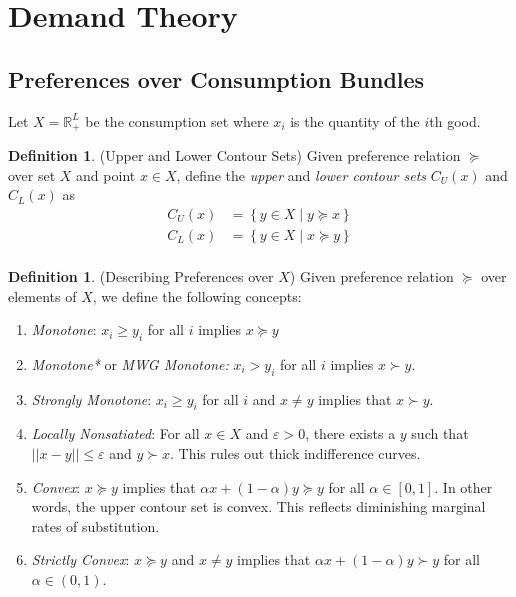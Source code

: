 \documentclass[12pt]{article}
\theoremstyle{plain}
\theoremstyle{definition}
\newtheorem{defn}[thm]{Definition}
\theoremstyle{remark}
\newcommand{\R}{\mathbb{R}}
\begin{document}
\clearpage
\section{Demand Theory}

\subsection{Preferences over Consumption Bundles}

Let $X=\R^L_+$ be the consumption set where $x_i$ is the quantity of the
$i$th good.

\begin{defn}(Upper and Lower Contour Sets)
Given preference relation $\succeq$ over set $X$ and point $x\in X$,
define the \emph{upper} and \emph{lower contour sets} $C_U(x)$ and
$C_L(x)$ as
\begin{align*}
  C_U(x) &= \left\{ y \in X \;|\; y \succeq x \right\} \\
  C_L(x) &= \left\{ y \in X \;|\; x \succeq y \right\} \\
\end{align*}
\end{defn}

\begin{defn}(Describing Preferences over $X$)
Given preference relation $\succeq$ over elements of $X$, we define the
following concepts:
\begin{enumerate}
  \item \emph{Monotone}:
    $x_i \geq y_i$ for all $i$ implies $x \succeq y$
  \item \emph{Monotone*} or \emph{MWG Monotone:}
    $x_i > y_i$ for all $i$ implies $x \succ y$.
  \item \emph{Strongly Monotone}: $x_i\geq y_i$ for all $i$ and
    $x\neq y$ implies that $x\succ y$.

  \item \emph{Locally Nonsatiated}: For all $x\in X$ and
    $\varepsilon>0$, there exists a $y$ such that $||x-y||\leq
    \varepsilon$ and $y\succ x$. This rules out thick indifference
    curves.

  \item \emph{Convex}: $x \succeq y$ implies that
    $\alpha x + (1-\alpha) y \succeq y$ for all $\alpha\in[0,1]$.
    In other words, the upper contour set is convex.
    This reflects diminishing marginal rates of substitution.

  \item \emph{Strictly Convex}: $x \succeq y$ and $x\neq y$ implies that
    $\alpha x + (1-\alpha) y \succ y$ for all $\alpha\in(0,1)$.
\end{enumerate}
\end{defn}
\end{document}
